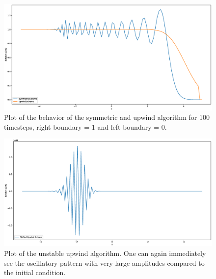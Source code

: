 \documentclass{scrartcl}
\begin{document}
\begin{figure}[H]
	\centering
	\includegraphics[width=1.0\linewidth]{Plots/symmetric_and_upwind}
	\caption{Plot of the behavior of the symmetric and upwind algorithm for 100 timesteps, right boundary = 1 and left boundary = 0.}
	\label{fig:symmetricandupwind}
\end{figure}

\begin{figure}[H]
	\centering
	\includegraphics[width=0.8\linewidth]{Plots/upwind_unstable}
	\caption{Plot of the unstable upwind algorithm. One can again immediately see the oscillatory pattern with very large amplitudes compared to the initial condition.}
	\label{fig:upwindunstable}
\end{figure}
\end{document}
